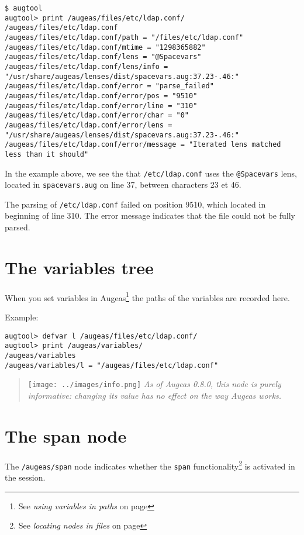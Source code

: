 \begin{verbatim}
$ augtool 
augtool> print /augeas/files/etc/ldap.conf/
/augeas/files/etc/ldap.conf
/augeas/files/etc/ldap.conf/path = "/files/etc/ldap.conf"
/augeas/files/etc/ldap.conf/mtime = "1298365882"
/augeas/files/etc/ldap.conf/lens = "@Spacevars"
/augeas/files/etc/ldap.conf/lens/info = "/usr/share/augeas/lenses/dist/spacevars.aug:37.23-.46:"
/augeas/files/etc/ldap.conf/error = "parse_failed"
/augeas/files/etc/ldap.conf/error/pos = "9510"
/augeas/files/etc/ldap.conf/error/line = "310"
/augeas/files/etc/ldap.conf/error/char = "0"
/augeas/files/etc/ldap.conf/error/lens = "/usr/share/augeas/lenses/dist/spacevars.aug:37.23-.46:"
/augeas/files/etc/ldap.conf/error/message = "Iterated lens matched less than it should"
\end{verbatim}
In the example above, we see the that \verb!/etc/ldap.conf! uses the \verb!@Spacevars! lens, located in \verb!spacevars.aug! on line 37, between characters 23 et 46.

The parsing of \verb!/etc/ldap.conf! failed on position 9510, which located in beginning of line 310. The error message indicates that the file could not be fully parsed.


\section{The variables tree}

 

When you set variables in Augeas\footnote{See \emph{using variables in paths} on page \pageref{sec:variables}} the paths of the variables are recorded here.

 

Example:

\begin{verbatim}
augtool> defvar l /augeas/files/etc/ldap.conf/
augtool> print /augeas/variables/
/augeas/variables
/augeas/variables/l = "/augeas/files/etc/ldap.conf"
\end{verbatim}
\begin{quote}
\texttt{[image: ../images/info.png]} \emph{As of Augeas 0.8.0, this node is purely informative: changing its value has no effect on the way Augeas works.}

\end{quote}
\section{The span node}

\label{sec:span_node}   

The \verb!/augeas/span! node indicates whether the \verb!span! functionality\footnote{See \emph{locating nodes in files} on page \pageref{sec:locating_nodes}} is activated in the session.


